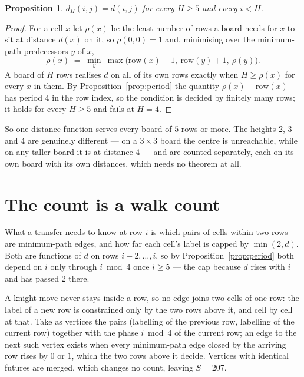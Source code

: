 \documentclass[11pt,a4paper]{article}
\theoremstyle{plain}
\newtheorem{proposition}[theorem]{Proposition}
\theoremstyle{definition}
\begin{document}
\begin{proposition}\label{prop:height}
$d_H(i,j)=d(i,j)$ for every $H\ge5$ and every $i<H$.
\end{proposition}

\begin{proof}
For a cell $x$ let $\rho(x)$ be the least number of rows a board needs for $x$ to sit at distance $d(x)$ on it, so $\rho(0,0)=1$ and, minimising over the minimum-path predecessors $y$ of $x$,
\[ \rho(x)\;=\;\min_y\ \max\bigl(\mathrm{row}(x)+1,\ \mathrm{row}(y)+1,\ \rho(y)\bigr). \]
A board of $H$ rows realises $d$ on all of its own rows exactly when $H\ge\rho(x)$ for every $x$ in them. By Proposition~\ref{prop:period} the quantity $\rho(x)-\mathrm{row}(x)$ has period $4$ in the row index, so the condition is decided by finitely many rows; it holds for every $H\ge5$ and fails at $H=4$.
\end{proof}

So one distance function serves every board of $5$ rows or more. The heights 2, 3 and 4 are genuinely different --- on a $3\times3$ board the centre is unreachable, while on any taller board it is at distance $4$ --- and are counted separately, each on its own board with its own distances, which needs no theorem at all.

\section{The count is a walk count}

What a transfer needs to know at row $i$ is which pairs of cells within two rows are minimum-path edges, and how far each cell's label is capped by $\min(2,d)$. Both are functions of $d$ on rows $i-2,\dots,i$, so by Proposition~\ref{prop:period} both depend on $i$ only through $i\bmod 4$ once $i\ge5$ --- the cap because $d$ rises with $i$ and has passed $2$ there.

A knight move never stays inside a row, so no edge joins two cells of one row: the label of a new row is constrained only by the two rows above it, and cell by cell at that. Take as vertices the pairs (labelling of the previous row, labelling of the current row) together with the phase $i\bmod 4$ of the current row; an edge to the next such vertex exists when every minimum-path edge closed by the arriving row rises by $0$ or $1$, which the two rows above it decide. Vertices with identical futures are merged, which changes no count, leaving $S=207$.
\end{document}

